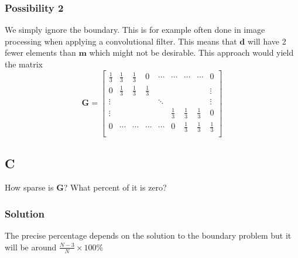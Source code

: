 \subsubsection*{Possibility 2}
We simply ignore the boundary. This is for example often done in image processing when applying a convolutional filter. This means that $\mathbf{d}$ will have 2 fewer elements than $\mathbf{m}$ which might not be desirable. This approach would yield the matrix
\begin{equation*}
    \mathbf{G} = 
    \begin{bmatrix}
        \frac{1}{3} & \frac{1}{3} & \frac{1}{3} & 0 & \cdots & \cdots & \cdots & \cdots & 0\\
        0 & \frac{1}{3} & \frac{1}{3} & \frac{1}{3} & & & & & \vdots \\
        \vdots & & & & \ddots & & & & \vdots \\
        \vdots & & & & & \frac{1}{3} & \frac{1}{3} & \frac{1}{3} & 0\\
        0 & \cdots & \cdots & \cdots & \cdots & 0 & \frac{1}{3} & \frac{1}{3} & \frac{1}{3}\\
    \end{bmatrix}
\end{equation*}
\subsection*{C}
How sparse is $\mathbf{G}$? What percent of it is zero?
\subsubsection*{Solution}
The precise percentage depends on the solution to the boundary problem but it will be around $\frac{N-3}{N}\times 100\%$